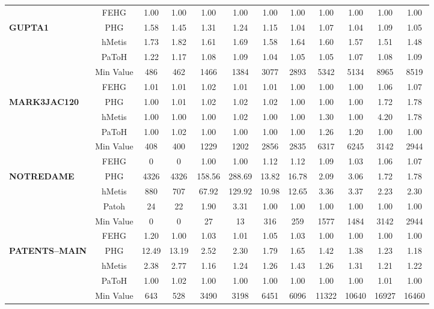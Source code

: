 \documentclass[twocolumn]{svjour3}          \smartqed
\begin{document}
\begin{table*}[hp]
{\begin{threeparttable}
\begin{tabular}{|l|c|cc|cc|cc|cc|cc|}
& FEHG			& 1.00	& 1.00	& 1.00	& 1.00	& 1.00	& 1.00	& 1.00	& 1.00	& 1.00	& 1.00 \\
\textbf{ GUPTA1}
			& PHG			& 1.58	& 1.45	& 1.31	& 1.24	& 1.15	& 1.04	& 1.07	& 1.04	& 1.09	& 1.05 \\
			& hMetis			& 1.73	& 1.82	& 1.61	& 1.69	& 1.58	& 1.64	& 1.60	& 1.57	& 1.51	& 1.48 \\
			& PaToH			& 1.22	& 1.17	& 1.08	& 1.09	& 1.04	& 1.05	& 1.05	& 1.07	& 1.08	& 1.09 \\
			\cline{2-12}
			& Min Value		& 486	& 462	& 1466	& 1384	& 3077	& 2893	& 5342	& 5134	& 8965& 8519 \\
			\hline

& FEHG			& 1.01	& 1.01	& 1.02	& 1.01	& 1.01	& 1.00	& 1.00	& 1.00	& 1.06	& 1.07 \\
\textbf{ MARK3JAC120}
			& PHG			& 1.00	& 1.01	& 1.02	& 1.02	& 1.02	& 1.00	& 1.00	& 1.00	& 1.72	& 1.78 \\
			& hMetis			& 1.00	& 1.00	& 1.00	& 1.02	& 1.00	& 1.00	& 1.30	& 1.00	& 4.20	& 1.78 \\
			& PaToH			& 1.00	& 1.02	& 1.00	& 1.00	& 1.00	& 1.00	& 1.26	& 1.20	& 1.00 	& 1.00 \\
			\cline{2-12}
			& Min Value		& 408	& 400	& 1229	& 1202	& 2856	& 2835	& 6317	& 6245	& 3142& 2944 \\
			\hline

& FEHG			& 0		& 0		& 1.00	& 1.00	& 1.12	& 1.12	& 1.09	& 1.03	& 1.06	& 1.07 \\
\textbf{ NOTREDAME\tnote{\textasteriskcentered}}
			& PHG			& 4326	& 4326	& 158.56	& 288.69& 13.82	& 16.78& 2.09	& 3.06	& 1.72	& 1.78 \\
			& hMetis			& 880	& 707	& 67.92	& 129.92& 10.98	& 12.65& 3.36	& 3.37	& 2.23	& 2.30 \\
			& Patoh			& 24		& 22		& 1.90	& 3.31	& 1.00	& 1.00	& 1.00	& 1.00	& 1.00	& 1.00 \\
			\cline{2-12}
			& Min Value		& 0		& 0		& 27		& 13		& 316	& 259	& 1577	& 1484	& 3142 & 2944 \\
			\hline

& FEHG			& 1.20	& 1.00	& 1.03	& 1.01	& 1.05	& 1.03	& 1.00	& 1.00	& 1.00	& 1.00 \\
\textbf{ PATENTS--MAIN}
			& PHG			& 12.49	& 13.19	& 2.52	& 2.30	& 1.79	& 1.65	& 1.42	& 1.38	& 1.23	& 1.18 \\
			& hMetis			& 2.38	& 2.77	& 1.16	& 1.24	& 1.26	& 1.43	& 1.26	& 1.31	& 1.21	& 1.22 \\
			& PaToH			& 1.00	& 1.02	& 1.00	& 1.00	& 1.00	& 1.00	& 1.00	& 1.00	& 1.01	& 1.00 \\
			\cline{2-12}
			& Min Value		& 643	& 528	& 3490	& 3198	& 6451	& 6096	& 11322	& 10640	&16927 & 16460 \\
			\hline


\end{tabular}
\end{threeparttable}}
\end{table*}
\end{document}
